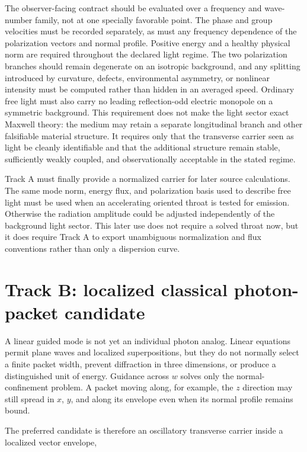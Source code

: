 The observer-facing contract should be evaluated over a frequency and
wave-number family, not at one specially favorable point. The phase and group
velocities must be recorded separately, as must any frequency dependence of the
polarization vectors and normal profile. Positive energy and a healthy physical
norm are required throughout the declared light regime. The two polarization
branches should remain degenerate on an isotropic background, and any splitting
introduced by curvature, defects, environmental asymmetry, or nonlinear
intensity must be computed rather than hidden in an averaged speed. Ordinary
free light must also carry no leading reflection-odd electric monopole on a
symmetric background. This requirement does not make the light sector exact
Maxwell theory: the medium may retain a separate longitudinal branch and other
falsifiable material structure. It requires only that the transverse carrier
seen as light be cleanly identifiable and that the additional structure remain
stable, sufficiently weakly coupled, and observationally acceptable in the
stated regime.

Track A must finally provide a normalized carrier for later source calculations.
The same mode norm, energy flux, and polarization basis used to describe free
light must be used when an accelerating oriented throat is tested for emission.
Otherwise the radiation amplitude could be adjusted independently of the
background light sector. This later use does not require a solved throat now,
but it does require Track A to export unambiguous normalization and flux
conventions rather than only a dispersion curve.

\section{Track B: localized classical photon-packet candidate}

A linear guided mode is not yet an individual photon analog. Linear equations
permit plane waves and localized superpositions, but they do not normally
select a finite packet width, prevent diffraction in three dimensions, or
produce a distinguished unit of energy. Guidance across \(w\) solves only the
normal-confinement problem. A packet moving along, for example, the \(z\)
direction may still spread in \(x\), \(y\), and along its envelope even when its
normal profile remains bound.

The preferred candidate is therefore an oscillatory transverse carrier inside
a localized vector envelope,

